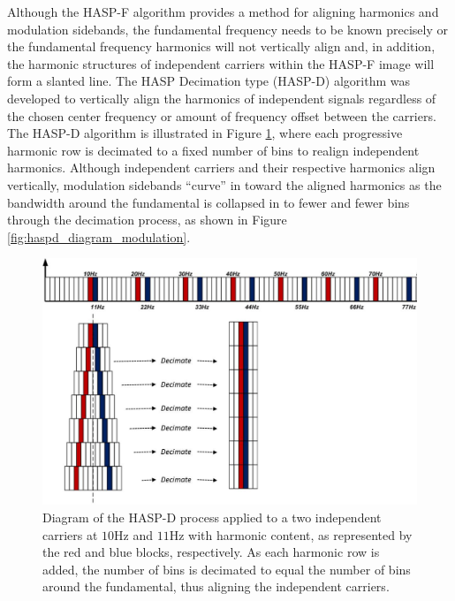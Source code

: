Although the HASP-F algorithm provides a method for aligning harmonics and modulation sidebands, the fundamental frequency needs to be known precisely or the fundamental frequency harmonics will not vertically align and, in addition, the harmonic structures of independent carriers within the HASP-F image will form a slanted line.  The HASP Decimation type (HASP-D) algorithm was developed to vertically align the harmonics of independent signals regardless of the chosen center frequency or amount of frequency offset between the carriers.  The HASP-D algorithm is illustrated in Figure \ref{fig:haspd_diagram_independent}, where each progressive harmonic row is decimated to a fixed number of bins to realign independent harmonics.  Although independent carriers and their respective harmonics align vertically, modulation sidebands ``curve'' in toward the aligned harmonics as the bandwidth around the fundamental is collapsed in to fewer and fewer bins through the decimation process, as shown in Figure \ref{fig:haspd_diagram_modulation}.

\begin{figure}[tp]
	\includegraphics[width=\textwidth]{./misc_graphics/haspd_diagram_independent.jpg}
	\centering
	\caption{Diagram of the HASP-D process applied to a two independent carriers at $10$Hz and $11$Hz with harmonic content, as represented by the red and blue blocks, respectively.  As each harmonic row is added, the number of bins is decimated to equal the number of bins around the fundamental, thus aligning the independent carriers.}
	\label{fig:haspd_diagram_independent}
\end{figure}

